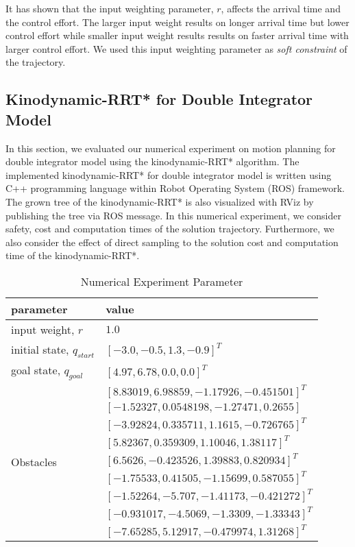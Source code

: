 \documentclass[../thesis.tex]{subfiles}
\begin{document}
It has shown that the input weighting parameter, $r$, affects the arrival time and the control effort. The larger input weight results on longer arrival time but lower control effort while smaller input weight results results on faster arrival time with larger control effort. We used this input weighting parameter as \emph{soft constraint} of the trajectory.

\subsection{Kinodynamic-RRT* for Double Integrator Model}
In this section, we evaluated our numerical experiment on motion planning for double integrator model using the kinodynamic-RRT* algorithm. The implemented kinodynamic-RRT* for double integrator model is written using C++ programming language within Robot Operating System (ROS) framework. The grown tree of the kinodynamic-RRT* is also visualized with RViz by publishing the tree via ROS message. In this numerical experiment, we consider safety,  cost and computation times of the solution trajectory. Furthermore, we also consider the effect of direct sampling to the solution cost and computation time of the kinodynamic-RRT*. 

\begin{table}[H]
\caption{Numerical Experiment Parameter}
\label{param_table}
\centering
\begin{tabular}{|l|l|}
\hline
parameter                 & value \\ \hline
input weight, $r$          & $1.0$   \\ \hline
initial state, $q_{start}$ & $[-3.0, -0.5, 1.3, -0.9]^T$      \\ \hline
goal state, $q_{goal}$     & $[4.97, 6.78, 0.0, 0.0]^T$      \\ \hline
\multirow{9}{*}{Obstacles} & $[8.83019,6.98859,-1.17926,-0.451501]^T$ \\ \cline{2-2} 
                           & $[-1.52327,0.0548198,-1.27471,0.2655]$ \\ \cline{2-2} 
                           & $[-3.92824,0.335711,1.1615,-0.726765]^T$ \\ \cline{2-2} 
                           & $[5.82367,0.359309,1.10046,1.38117]^T$ \\ \cline{2-2} 
                           & $[6.5626,-0.423526,1.39883,0.820934]^T$ \\ \cline{2-2} 
                           & $[-1.75533,0.41505,-1.15699,0.587055]^T$ \\ \cline{2-2} 
                           & $[-1.52264,-5.707,-1.41173,-0.421272]^T$ \\ \cline{2-2} 
                           & $[-0.931017,-4.5069,-1.3309,-1.33343]^T$ \\ \cline{2-2} 
                           & $[-7.65285,5.12917,-0.479974,1.31268]^T$ \\ \hline
\end{tabular}
\end{table}
\end{document}
